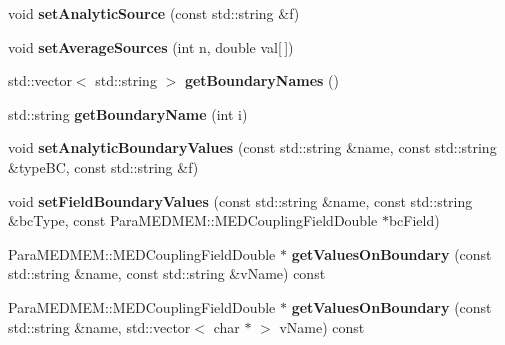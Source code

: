 \begin{DoxyCompactItemize}
\item 
\hypertarget{class_l_i_b_m_e_s_h_ac81b0e8d508151e4b5ae7c23ac062d73}{void {\bfseries set\-Analytic\-Source} (const std\-::string \&f)}\label{class_l_i_b_m_e_s_h_ac81b0e8d508151e4b5ae7c23ac062d73}

\item 
\hypertarget{class_l_i_b_m_e_s_h_affe723f2d372b86e17b38128e7d043e7}{void {\bfseries set\-Average\-Sources} (int n, double val\mbox{[}$\,$\mbox{]})}\label{class_l_i_b_m_e_s_h_affe723f2d372b86e17b38128e7d043e7}

\item 
\hypertarget{class_l_i_b_m_e_s_h_a1c5b0fb11e684d38022e266910e50068}{std\-::vector$<$ std\-::string $>$ {\bfseries get\-Boundary\-Names} ()}\label{class_l_i_b_m_e_s_h_a1c5b0fb11e684d38022e266910e50068}

\item 
\hypertarget{class_l_i_b_m_e_s_h_a3bc61a5336af51535ac176dfb922f686}{std\-::string {\bfseries get\-Boundary\-Name} (int i)}\label{class_l_i_b_m_e_s_h_a3bc61a5336af51535ac176dfb922f686}

\item 
\hypertarget{class_l_i_b_m_e_s_h_a1ceb20870251b53bc3d6db5cc526527a}{void {\bfseries set\-Analytic\-Boundary\-Values} (const std\-::string \&name, const std\-::string \&type\-B\-C, const std\-::string \&f)}\label{class_l_i_b_m_e_s_h_a1ceb20870251b53bc3d6db5cc526527a}

\item 
\hypertarget{class_l_i_b_m_e_s_h_a7df5ad4fd176aa449c400c27ed668c27}{void {\bfseries set\-Field\-Boundary\-Values} (const std\-::string \&name, const std\-::string \&bc\-Type, const Para\-M\-E\-D\-M\-E\-M\-::\-M\-E\-D\-Coupling\-Field\-Double $\ast$bc\-Field)}\label{class_l_i_b_m_e_s_h_a7df5ad4fd176aa449c400c27ed668c27}

\item 
\hypertarget{class_l_i_b_m_e_s_h_af54e016f79a070f14d9c371ef7053e6c}{Para\-M\-E\-D\-M\-E\-M\-::\-M\-E\-D\-Coupling\-Field\-Double $\ast$ {\bfseries get\-Values\-On\-Boundary} (const std\-::string \&name, const std\-::string \&v\-Name) const }\label{class_l_i_b_m_e_s_h_af54e016f79a070f14d9c371ef7053e6c}

\item 
\hypertarget{class_l_i_b_m_e_s_h_a47823d380756e39ea0d2dba9561e13d3}{Para\-M\-E\-D\-M\-E\-M\-::\-M\-E\-D\-Coupling\-Field\-Double $\ast$ {\bfseries get\-Values\-On\-Boundary} (const std\-::string \&name, std\-::vector$<$ char $\ast$ $>$ v\-Name) const }\label{class_l_i_b_m_e_s_h_a47823d380756e39ea0d2dba9561e13d3}


\end{DoxyCompactItemize}
